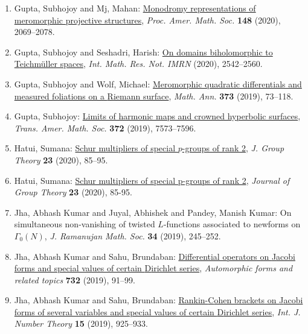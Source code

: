 \begin{enumerate}[resume, leftmargin=27pt]
	\item Gupta, Subhojoy and Mj, Mahan: \href{https://doi.org/10.1090/proc/14866}{Monodromy representations of meromorphic projective
		      structures}, \emph{Proc. Amer. Math. Soc.} {\bf 148} (2020), 2069--2078.

	\item Gupta, Subhojoy and Seshadri, Harish: \href{https://doi.org/10.1093/imrn/rny204}{On domains biholomorphic to {T}eichm\"{u}ller spaces}, \emph{Int. Math. Res. Not. IMRN} {\bf } (2020), 2542--2560.

	\item Gupta, Subhojoy and Wolf, Michael: \href{https://doi.org/10.1007/s00208-018-1674-z}{Meromorphic quadratic differentials and measured foliations on
		      a {R}iemann surface}, \emph{Math. Ann.} {\bf 373} (2019), 73--118.

	\item Gupta, Subhojoy: \href{https://doi.org/10.1090/tran/7777}{Limits of harmonic maps and crowned hyperbolic surfaces}, \emph{Trans. Amer. Math. Soc.} {\bf 372} (2019), 7573--7596.

	\item Hatui, Sumana: \href{https://doi.org/10.1515/jgth-2019-0045}{Schur multipliers of special {$p$}-groups of rank 2}, \emph{J. Group Theory} {\bf 23} (2020), 85--95.

	\item Hatui, Sumana: \href{https://www.degruyter.com/view/journals/jgth/23/1/article-p85.xml}{Schur multipliers of special p-groups of rank 2}, \emph{Journal of Group Theory} {\bf 23} (2020), 85-95.

	\item Jha, Abhash Kumar and Juyal, Abhishek and Pandey, Manish
	      Kumar: On simultaneous non-vanishing of twisted {$L$}-functions
	      associated to newforms on {$\Gamma_0(N)$}, \emph{J. Ramanujan Math. Soc.} {\bf 34} (2019), 245--252.

	\item Jha, Abhash Kumar and Sahu, Brundaban: \href{https://doi.org/10.1090/conm/732/14793}{Differential operators on {J}acobi forms and special values of
		      certain {D}irichlet series}, \emph{Automorphic forms and related topics} {\bf 732} (2019), 91--99.

	\item Jha, Abhash Kumar and Sahu, Brundaban: \href{https://doi.org/10.1142/S1793042119500490}{Rankin-{C}ohen brackets on {J}acobi forms of several variables
	      and special values of certain {D}irichlet series}, \emph{Int. J. Number Theory} {\bf 15} (2019), 925--933.



\end{enumerate}
